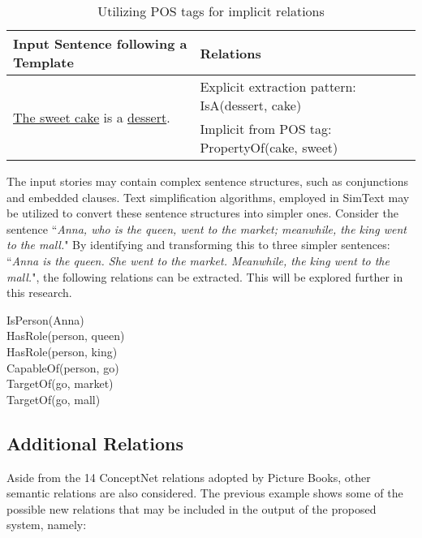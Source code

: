 \begin{table}[ht]   %
\centering
\caption{Utilizing POS tags for implicit relations} \vspace{0.25em}
\begin{tabular}{|l|p{6cm}|} \hline
Input Sentence following a Template & Relations \\ \hline
\multirow{2}{*}{\underline{The sweet cake} is a \underline{dessert}.} & Explicit extraction pattern: IsA(dessert, cake) \\
 & Implicit from POS tag: PropertyOf(cake, sweet) \\ \hline
\end{tabular}
\label{tab:utilizeposforimplicit}
\end{table}

The input stories may contain complex sentence structures, such as conjunctions and embedded clauses. Text simplification algorithms, employed in SimText \cite{Damay:2007} may be utilized to convert these sentence structures into simpler ones. Consider the sentence ``\textit{Anna, who is the queen, went to the market; meanwhile, the king went to the mall.}" By identifying and transforming this to three simpler sentences: ``\textit{Anna is the queen. She went to the market. Meanwhile, the king went to the mall.}", the following relations can be extracted. This will be explored further in this research.

\noindent
	\hspace{1 in}IsPerson(Anna) \\
	\hspace*{1 in}HasRole(person, queen) \\
	\hspace*{1 in}HasRole(person, king) \\
	\hspace*{1 in}CapableOf(person, go) \\
	\hspace*{1 in}TargetOf(go, market) \\
	\hspace*{1 in}TargetOf(go, mall)
	
\subsection{Additional Relations}
\label{sec:addrelations}
	
Aside from the 14 ConceptNet relations adopted by Picture Books, other semantic relations are also considered. The previous example shows some of the possible new relations that may be included in the output of the proposed system, namely:

